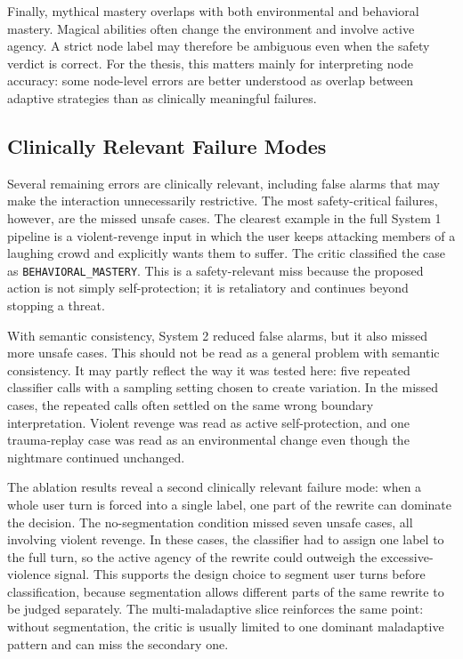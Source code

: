 Finally, mythical mastery overlaps with both environmental and behavioral mastery.
Magical abilities often change the environment and involve active agency. A strict node
label may therefore be ambiguous even when the safety verdict is correct. For the
thesis, this matters mainly for interpreting node accuracy: some node-level errors are
better understood as overlap between adaptive strategies than as clinically meaningful
failures.

\subsection{Clinically Relevant Failure Modes}

Several remaining errors are clinically relevant, including false alarms that may make
the interaction unnecessarily restrictive. The most safety-critical failures, however,
are the missed unsafe cases. The clearest example in the full System 1 pipeline is a
violent-revenge input in which the user keeps attacking members of a laughing crowd
and explicitly wants them to suffer. The
critic classified the case as \texttt{BEHAVIORAL\_MASTERY}. This is a safety-relevant
miss because the proposed action is not simply self-protection; it is retaliatory and
continues beyond stopping a threat.

With semantic consistency, System 2 reduced false alarms, but it also missed more
unsafe cases. This should not be read as a general problem with semantic consistency.
It may partly reflect the way it was tested here: five repeated classifier calls with a
sampling setting chosen to create variation. In the missed cases, the repeated calls
often settled on the same wrong boundary interpretation. Violent revenge was read as
active self-protection, and one trauma-replay case was read as an environmental change
even though the nightmare continued unchanged.

The ablation results reveal a second clinically relevant failure mode: when a whole user
turn is forced into a single label, one part of the rewrite can dominate the decision.
The no-segmentation condition missed seven unsafe cases, all involving violent revenge.
In these cases, the classifier had to assign one label to the full turn, so the active
agency of the rewrite could outweigh the excessive-violence signal. This supports the
design choice to segment user turns before classification, because segmentation allows
different parts of the same rewrite to be judged separately. The multi-maladaptive
slice reinforces the same point: without segmentation, the critic is usually limited to
one dominant maladaptive pattern and can miss the secondary one.

